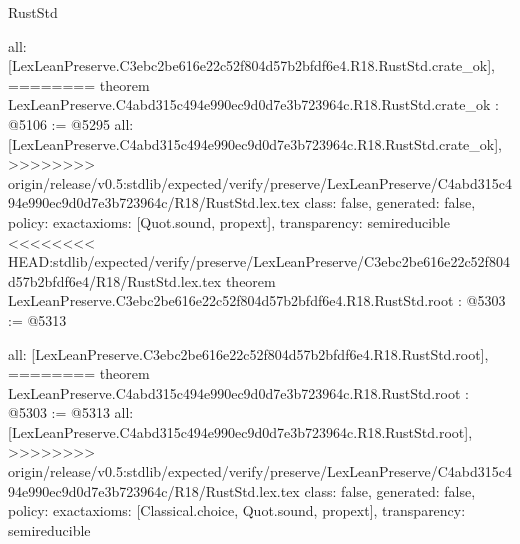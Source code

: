 \begin{lexlean}{RustStd}
\begin{coremodule}
{\begin{coremodule}
{{{{{{{{{{  all: [LexLeanPreserve.C3ebc2be616e22c52f804d57b2bfdf6e4.R18.RustStd.crate_ok],
========
theorem LexLeanPreserve.C4abd315c494e990ec9d0d7e3b723964c.R18.RustStd.crate_ok : @5106 := @5295 {
  all: [LexLeanPreserve.C4abd315c494e990ec9d0d7e3b723964c.R18.RustStd.crate_ok],
>>>>>>>> origin/release/v0.5:stdlib/expected/verify/preserve/LexLeanPreserve/C4abd315c494e990ec9d0d7e3b723964c/R18/RustStd.lex.tex
  class: false,
  generated: false,
  policy: exact{axioms: [Quot.sound, propext]},
  transparency: semireducible
}
<<<<<<<< HEAD:stdlib/expected/verify/preserve/LexLeanPreserve/C3ebc2be616e22c52f804d57b2bfdf6e4/R18/RustStd.lex.tex
theorem LexLeanPreserve.C3ebc2be616e22c52f804d57b2bfdf6e4.R18.RustStd.root : @5303 := @5313 {
  all: [LexLeanPreserve.C3ebc2be616e22c52f804d57b2bfdf6e4.R18.RustStd.root],
========
theorem LexLeanPreserve.C4abd315c494e990ec9d0d7e3b723964c.R18.RustStd.root : @5303 := @5313 {
  all: [LexLeanPreserve.C4abd315c494e990ec9d0d7e3b723964c.R18.RustStd.root],
>>>>>>>> origin/release/v0.5:stdlib/expected/verify/preserve/LexLeanPreserve/C4abd315c494e990ec9d0d7e3b723964c/R18/RustStd.lex.tex
  class: false,
  generated: false,
  policy: exact{axioms: [Classical.choice, Quot.sound, propext]},
  transparency: semireducible
}

}}}}}}}}}}}
\end{coremodule}}
\end{coremodule}
\end{lexlean}
